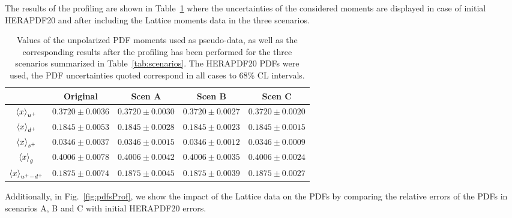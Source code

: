 The results of the profiling are shown in Table~\ref{tab:unpolmomentsProf} where the uncertainties
of the considered moments are displayed in case of initial HERAPDF20 and after including the Lattice
moments data in the three scenarios.
\begin{table}[h]
  \centering
  \renewcommand{\arraystretch}{1.3} 
\begin{tabular}{c||c|c|c|c}
  \hline &  Original  & Scen A  &  Scen B  &  Scen C  \\
  \hline
  \hline
  $\left\langle x\right\rangle_{u^+}$     &  $0.3720\pm 0.0036$  &  $0.3720\pm 0.0030$  &  $0.3720\pm 0.0027$  &  $0.3720\pm 0.0020$ \\
  $\left\langle x\right\rangle_{d^+}$     &  $0.1845\pm 0.0053$  &  $0.1845\pm 0.0028$  &  $0.1845\pm 0.0023$  &  $0.1845\pm 0.0015$ \\
  $\left\langle x\right\rangle_{s^+}$     &  $0.0346\pm 0.0037$  &  $0.0346\pm 0.0015$  &  $0.0346\pm 0.0012$  &  $0.0346\pm 0.0009$ \\
  $\left\langle x\right\rangle_{g}$       &  $0.4006\pm 0.0078$  &  $0.4006\pm 0.0042$  &  $0.4006\pm 0.0035$  &  $0.4006\pm 0.0024$ \\
  $\left\langle x\right\rangle_{u^+-d^+}$ &  $0.1875\pm 0.0074$  &  $0.1875\pm 0.0045$  &  $0.1875\pm 0.0039$  &  $0.1875\pm 0.0027$ \\
  \hline
\end{tabular}
\caption{\small Values of the unpolarized PDF moments
  used as pseudo-data, as well as the corresponding results
  after the profiling has been performed for the
three scenarios summarized in Table~\ref{tab:scenarios}.
%
The HERAPDF20 PDFs were used, the PDF uncertainties quoted correspond in all cases to 68\%
CL intervals.
\label{tab:unpolmomentsProf}
}
\end{table}
%
Additionally, in Fig.~\ref{fig:pdfsProf}, we show the impact of the Lattice data on the PDFs by
comparing the relative errors of the PDFs in scenarios A, B and C with initial HERAPDF20 errors.
%
